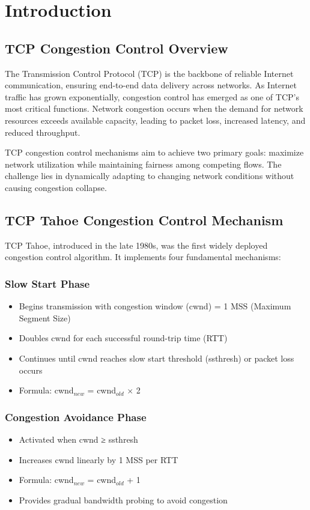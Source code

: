 \documentclass[12pt]{article}
\begin{document}
\section{Introduction}

\subsection{TCP Congestion Control Overview}

The Transmission Control Protocol (TCP) is the backbone of reliable Internet communication, ensuring end-to-end data delivery across networks. As Internet traffic has grown exponentially, congestion control has emerged as one of TCP's most critical functions. Network congestion occurs when the demand for network resources exceeds available capacity, leading to packet loss, increased latency, and reduced throughput.

TCP congestion control mechanisms aim to achieve two primary goals: maximize network utilization while maintaining fairness among competing flows. The challenge lies in dynamically adapting to changing network conditions without causing congestion collapse.

\subsection{TCP Tahoe Congestion Control Mechanism}

TCP Tahoe, introduced in the late 1980s, was the first widely deployed congestion control algorithm. It implements four fundamental mechanisms:

\subsubsection{Slow Start Phase}
\begin{itemize}
    \item Begins transmission with congestion window (cwnd) = 1 MSS (Maximum Segment Size)
    \item Doubles cwnd for each successful round-trip time (RTT)
    \item Continues until cwnd reaches slow start threshold (ssthresh) or packet loss occurs
    \item Formula: cwnd$_{new}$ = cwnd$_{old}$ $\times$ 2
\end{itemize}

\subsubsection{Congestion Avoidance Phase}
\begin{itemize}
    \item Activated when cwnd ≥ ssthresh
    \item Increases cwnd linearly by 1 MSS per RTT
    \item Formula: cwnd$_{new}$ = cwnd$_{old}$ + 1
    \item Provides gradual bandwidth probing to avoid congestion
\end{itemize}
\end{document}
